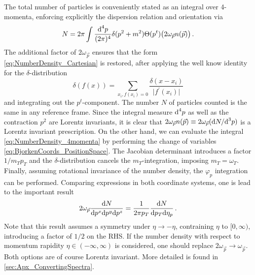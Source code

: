 The total number of particles is conveniently stated as an integral over 4-momenta, enforcing explicitly the dispersion relation and orientation via 
\begin{equation}
    N=2\pi\int\frac{\text{d}^4p}{(2\pi)^4}\delta(p^2+m^2)\Theta(p^t)\big(2\omega_{\vec{p}}n(\vec{p})\big)\,.
    \label{eq:NumberDensity_4momenta}
\end{equation}
The additional factor of $2\omega_{\vec{p}}$ ensures that the form \eqref{eq:NumberDensity_Cartesian} is restored, after applying the well know identity for the $\delta$-distribution
\begin{equation}
    \delta(f(x))=\sum_{x_i, f(x_i)=0}\frac{\delta(x-x_i)}{\vert f^\prime(x_i)\vert}
\end{equation}
and integrating out the $p^t$-component. The number $N$ of particles counted is the same in any reference frame. Since the integral measure $\text{d}^4p$ as well as the contraction $p^2$ are Lorentz invariants, it is clear that ${2\omega_{\vec{p}}n(\vec{p})\equiv 2\omega_{\vec{p}}(\text{d} N/\text{d}^3p)}$ is a Lorentz invariant prescription. On the other hand, we can evaluate the integral \eqref{eq:NumberDensity_4momenta} by performing the change of variables \eqref{eq:BjorkenCoords_PositionSpace}. The Jacobian determinant introduces a factor ${1/m_Tp_T}$ and the $\delta$-distribution cancels the $m_T$-integration, imposing $m_T=\omega_T$. Finally, assuming rotational invariance of the number density, the $\varphi_p$ integration can be performed. Comparing expressions in both coordinate systems, one is lead to the important result
\begin{equation}
    2\omega_{\vec{p}}\frac{\text{d} N}{\text{d} p^x\text{d} p^y\text{d} p^z}=\frac{1}{2\pi p_T}\frac{\text{d} N}{\text{d} p_T\text{d} \eta_p}\,.
\end{equation}
Note that this result assumes a symmetry under ${\eta\to-\eta}$, contraining $\eta$ to ${[0,\infty)}$, introducing a factor of $1/2$ on the RHS. If the number density with respect to momentum rapidity ${\eta\in(-\infty,\infty)}$ is considered, one should replace ${2\omega_{\vec{p}}\to\omega_{\vec{p}}}$. Both options are of course Lorentz invariant. More detailed is found in \ref{sec:Apx_ConvertingSpectra}.

